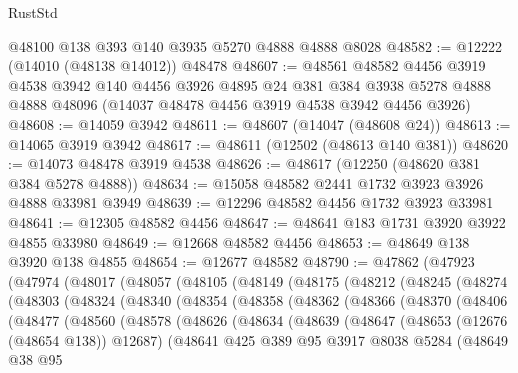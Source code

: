 \begin{lexlean}{RustStd}
\begin{coremodule}
    @48100
    @138
    @393
    @140
    @3935
    @5270
    @4888
    @4888
    @8028
@48582 := @12222 (@14010 (@48138 @14012)) @48478
@48607 := @48561
    @48582
    @4456
    @3919
    @4538
    @3942
    @140
    @4456
    @3926
    @4895
    @24
    @381
    @384
    @3938
    @5278
    @4888
    @4888
    @48096
    (@14037 @48478 @4456 @3919 @4538 @3942 @4456 @3926)
@48608 := @14059 @3942
@48611 := @48607 (@14047 (@48608 @24))
@48613 := @14065 @3919 @3942
@48617 := @48611 (@12502 (@48613 @140 @381))
@48620 := @14073 @48478 @3919 @4538
@48626 := @48617 (@12250 (@48620 @381 @384 @5278 @4888))
@48634 := @15058 @48582 @2441 @1732 @3923 @3926 @4888 @33981 @3949
@48639 := @12296 @48582 @4456 @1732 @3923 @33981
@48641 := @12305 @48582 @4456
@48647 := @48641 @183 @1731 @3920 @3922 @4855 @33980
@48649 := @12668 @48582 @4456
@48653 := @48649 @138 @3920 @138 @4855
@48654 := @12677 @48582
@48790 := @47862
    (@47923
      (@47974
        (@48017
          (@48057
            (@48105
              (@48149
                (@48175
                  (@48212
                    (@48245
                      (@48274
                        (@48303
                          (@48324
                            (@48340
                              (@48354
                                (@48358
                                  (@48362
                                    (@48366
                                      (@48370
                                        (@48406
                                          (@48477
                                            (@48560
                                              (@48578
                                                (@48626
                                                  (@48634
                                                    (@48639
                                                      (@48647
                                                        (@48653 (@12676 (@48654 @138)) @12687)
                                                        (@48641
                                                          @425
                                                          @389
                                                          @95
                                                          @3917
                                                          @8038
                                                          @5284
                                                          (@48649
                                                            @38
                                                            @95

\end{coremodule}
\end{lexlean}
